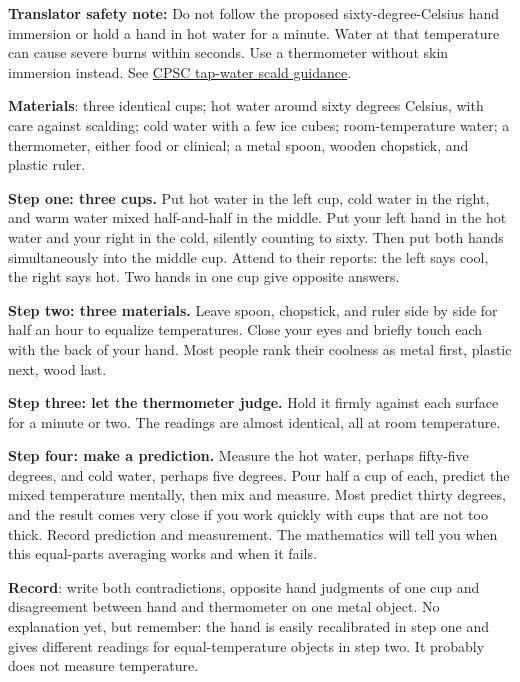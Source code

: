 \begin{experiment}
\textbf{Translator safety note:} Do not follow the proposed sixty-degree-Celsius hand immersion or hold a hand in hot water for a minute. Water at that temperature can cause severe burns within seconds. Use a thermometer without skin immersion instead. See \href{https://www.cpsc.gov/s3fs-public/5098.pdf}{CPSC tap-water scald guidance}.

\textbf{Materials}: three identical cups; hot water around sixty degrees Celsius, with care against scalding; cold water with a few ice cubes; room-temperature water; a thermometer, either food or clinical; a metal spoon, wooden chopstick, and plastic ruler.

\textbf{Step one: three cups.} Put hot water in the left cup, cold water in the right, and warm water mixed half-and-half in the middle. Put your left hand in the hot water and your right in the cold, silently counting to sixty. Then put both hands simultaneously into the middle cup. Attend to their reports: the left says cool, the right says hot. Two hands in one cup give opposite answers.

\textbf{Step two: three materials.} Leave spoon, chopstick, and ruler side by side for half an hour to equalize temperatures. Close your eyes and briefly touch each with the back of your hand. Most people rank their coolness as metal first, plastic next, wood last.

\textbf{Step three: let the thermometer judge.} Hold it firmly against each surface for a minute or two. The readings are almost identical, all at room temperature.

\textbf{Step four: make a prediction.} Measure the hot water, perhaps fifty-five degrees, and cold water, perhaps five degrees. Pour half a cup of each, predict the mixed temperature mentally, then mix and measure. Most predict thirty degrees, and the result comes very close if you work quickly with cups that are not too thick. Record prediction and measurement. The mathematics will tell you when this equal-parts averaging works and when it fails.

\textbf{Record}: write both contradictions, opposite hand judgments of one cup and disagreement between hand and thermometer on one metal object. No explanation yet, but remember: the hand is easily recalibrated in step one and gives different readings for equal-temperature objects in step two. It probably does not measure temperature.
\end{experiment}

